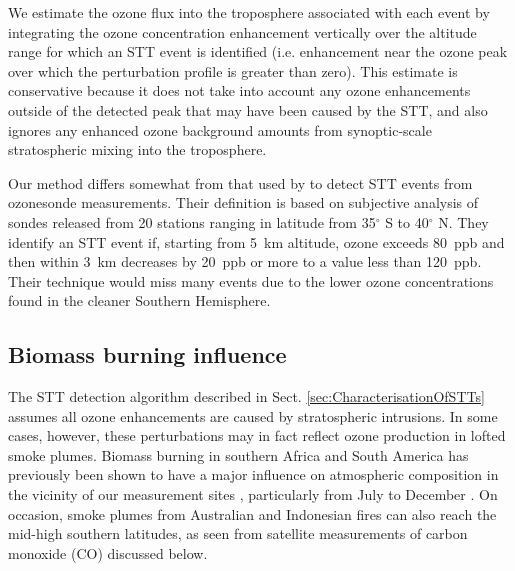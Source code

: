 \documentclass[acp, manuscript]{copernicus} %
\begin{document}
    We estimate the ozone flux into the troposphere associated with each event by integrating the ozone concentration enhancement vertically over the altitude range for which an STT event is identified (i.e. enhancement near the ozone peak over which the perturbation profile is greater than zero).
    This estimate is conservative because it does not take into account any ozone enhancements outside of the detected peak that may have been caused by the STT, and also ignores any enhanced ozone background amounts from synoptic-scale stratospheric mixing into the troposphere.

    Our method differs somewhat from that used by \citet{Tang2010} to detect STT events from ozonesonde measurements. 
    Their definition is based on subjective analysis of sondes released from 20 stations ranging in latitude from 35$^\circ$ S to 40$^\circ$ N.
    They identify an STT event if, starting from 5~km altitude, ozone exceeds 80~ppb and then within 3~km decreases by 20~ppb or more to a value less than 120~ppb.
    Their technique would miss many events due to the lower ozone concentrations found in the cleaner Southern Hemisphere.

  \subsection{Biomass burning influence}
  \label{sec:BiomassBurning}
    The STT detection algorithm described in Sect. \ref{sec:CharacterisationOfSTTs} assumes all ozone enhancements are caused by stratospheric intrusions.
    In some cases, however, these perturbations may in fact reflect ozone production in lofted smoke plumes.
    Biomass burning in southern Africa and South America has previously been shown to have a major influence on atmospheric composition in the vicinity of our measurement sites \citep{Oltmans2001, Gloudemans2006, Edwards2006}, particularly from July to December \citep{Pak2003, Liu2017}.
    On occasion, smoke plumes from Australian and Indonesian fires can also reach the mid-high southern latitudes, as seen from satellite measurements of carbon monoxide (CO) discussed below. %
\end{document}
